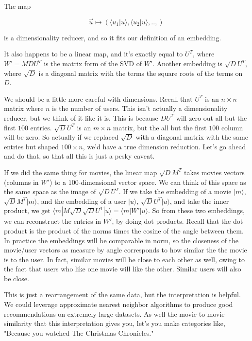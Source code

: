 \documentclass{amsbook}
\begin{document}
The map

$$
\vec u\mapsto\left(\langle u_1|u\rangle, \langle u_2|u\rangle, ..,\right)
$$

\noindent is a dimensionality reducer, and so it fits our definition of an embedding.

It also happens to be a linear map, and it's exactly equal to $U^T$, where $W'=MDU^T$ is the matrix form of the SVD of $W'$.  Another embedding is $\sqrt{D}U^T$, where $\sqrt{D}$ is a diagonal matrix with the terms the square roots of the terms on $D$.

We should be a little more careful with dimensions.  Recall that $U^T$ is an $n\times n$ matrix where $n$ is the number of users.  This isn't actually a dimensionality reducer, but we think of it like it is.  This is because $DU^T$ will zero out all but the first $100$ entries.  $\sqrt DU^T$ is an $m\times n$ matrix, but the all but the first $100$ column will be zero.  So actually if we replaced $\sqrt D$ with a diagonal matrix with the same entries but shaped $100\times n$, we'd have a true dimension reduction.  Let's go ahead and do that, so that all this is just a pesky caveat.

If we did the same thing for movies, the linear map $\sqrt DM^T$ takes movies vectors (columns in $W'$) to a $100$-dimensional vector space.  We can think of this space as the same space as the image of $\sqrt DU^T$.  If we take the embedding of a movie $|m\rangle$, $\sqrt DM^T|m\rangle$, and the embedding of a user $|u\rangle$, $\sqrt DU^T|u\rangle$, and take the inner product, we get $\langle m|M\sqrt D\sqrt DU^T|u\rangle=\langle m|W'|u\rangle$.  So from these two embeddings, we can reconstruct the entries in $W'$, by doing dot products.  Recall that the dot product is the product of the norms times the cosine of the angle between them.  In practice the embeddings will be comparable in norm, so the closeness of the movie/user vectors as measure by angle corresponds to how similar the the movie is to the user.  In fact, similar movies will be close to each other as well, owing to the fact that users who like one movie will like the other.  Similar users will also be close.

This is just a rearrangement of the same data, but the interpretation is helpful.  We could leverage approximate nearest neighbor algorithms to produce good recommendations on extremely large datasets.  As well the movie-to-movie similarity that this interpretation gives you, let's you make categories like, "Because you watched The Christmas Chronicles."
\end{document}
